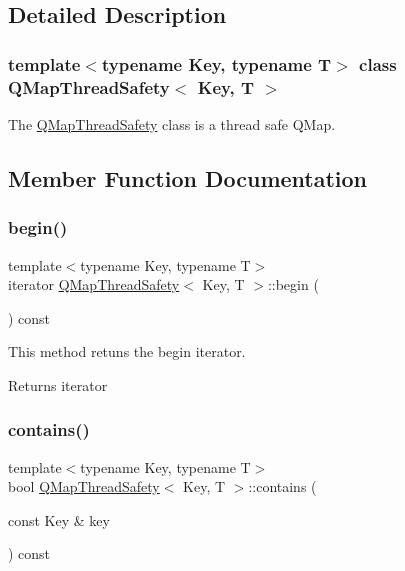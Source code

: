 \subsection{Detailed Description}
\subsubsection*{template$<$typename Key, typename T$>$\newline
class Q\+Map\+Thread\+Safety$<$ Key, T $>$}

The \mbox{\hyperlink{class_q_map_thread_safety}{Q\+Map\+Thread\+Safety}} class is a thread safe Q\+Map. 

\subsection{Member Function Documentation}
\mbox{\label{class_q_map_thread_safety_ac197a5375913e4ac19910b9bc4191a95}} 
\subsubsection{\texorpdfstring{begin()}{begin()}}
{\footnotesize\ttfamily template$<$typename Key, typename T$>$ \\
iterator \mbox{\hyperlink{class_q_map_thread_safety}{Q\+Map\+Thread\+Safety}}$<$ Key, T $>$\+::begin (\begin{DoxyParamCaption}{ }\end{DoxyParamCaption}) const\hspace{0.3cm}{\ttfamily [inline]}}



This method retuns the begin iterator. 

\begin{DoxyReturn}{Returns}
iterator 
\end{DoxyReturn}
\mbox{\label{class_q_map_thread_safety_acaafd9933cb391e27a81c26df712786b}} 
\subsubsection{\texorpdfstring{contains()}{contains()}}
{\footnotesize\ttfamily template$<$typename Key, typename T$>$ \\
bool \mbox{\hyperlink{class_q_map_thread_safety}{Q\+Map\+Thread\+Safety}}$<$ Key, T $>$\+::contains (\begin{DoxyParamCaption}\item[{const Key \&}]{key }\end{DoxyParamCaption}) const\hspace{0.3cm}{\ttfamily [inline]}}



